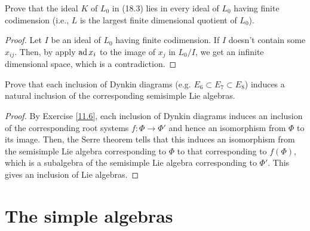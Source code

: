 \begin{ex}
	Prove that the ideal $K$ of $L_0$ in (18.3) lies in every ideal of $L_0$ having finite codimension (i.e., $L$ is the largest finite dimensional quotient of $L_0$).
\end{ex}
\begin{proof}
	Let $I$ be an ideal of $L_0$ having finite codimension. If $I$ doesn't contain some $x_{ij}$. Then, by apply $\operatorname{ad} x_i$ to the image of $x_j$ in $L_0/I$, we get an infinite dimensional space, which is a contradiction.
\end{proof}

\begin{ex}
	Prove that each inclusion of Dynkin diagrams (e.g. $E_6\subset E_7\subset E_8$) induces a natural inclusion of the corresponding semisimple Lie algebras.
\end{ex}
\begin{proof}
	By Exercise \ref{11.6}, each inclusion of Dynkin diagrams induces an inclusion of the corresponding root systems $f\colon\Phi\to\Phi'$ and hence an isomorphism from $\Phi$ to its image. Then, the Serre theorem tells that this induces an isomorphism from the semisimple Lie algebra corresponding to $\Phi$ to that corresponding to $f(\Phi)$, which is a subalgebra of the semisimple Lie algebra corresponding to $\Phi'$. This gives an inclusion of Lie algebras.
\end{proof}


\section{The simple algebras}
